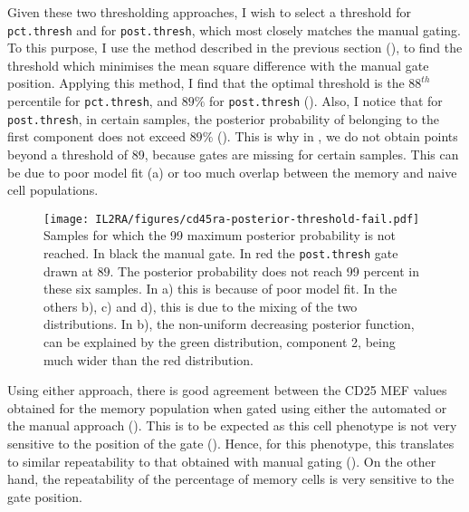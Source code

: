 Given these two thresholding approaches, I wish to select a threshold for \texttt{pct.thresh} and for \texttt{post.thresh}, which most closely matches the manual gating.
To this purpose, I use the method described in the previous section (), to find the threshold which minimises the mean square difference with the manual gate position.
Applying this method, I find that the optimal threshold is the $88^{th}$ percentile for \texttt{pct.thresh},
and $89\%$ for \texttt{post.thresh} ().
Also, I notice that for \texttt{post.thresh}, in certain samples,  the posterior probability
of belonging to the first component does not exceed $89\%$ ().
This is why in , we do not obtain points beyond a threshold of 89, because gates are missing for certain samples.
This can be due to poor model fit (a) or too much overlap between the memory and naive cell populations.

\begin{figure}[h]
\centering
  \texttt{[image: IL2RA/figures/cd45ra-posterior-threshold-fail.pdf]}
{Samples for which the 99 maximum posterior probability is not reached.}
{
  In black the manual gate.  In red the \texttt{post.thresh} gate drawn at $89$.
  The posterior probability does not reach 99 percent in these six samples.
  In a) this is because of poor model fit.
  In the others b), c) and d), this is due to the mixing of the two distributions.
  In b), the non-uniform decreasing posterior function, can be explained by the green distribution, component 2,
  being much wider than the red distribution.
}
\end{figure}


Using either approach, there is good agreement between the CD25 MEF values obtained for the memory population when gated using either the automated
or the manual approach ().
This is to be expected as this cell phenotype is not very sensitive to the position of the  gate
().  
Hence, for this phenotype, this translates to similar repeatability to that obtained with manual gating ().
On the other hand, the repeatability of the percentage of memory cells is very sensitive to the gate position.



